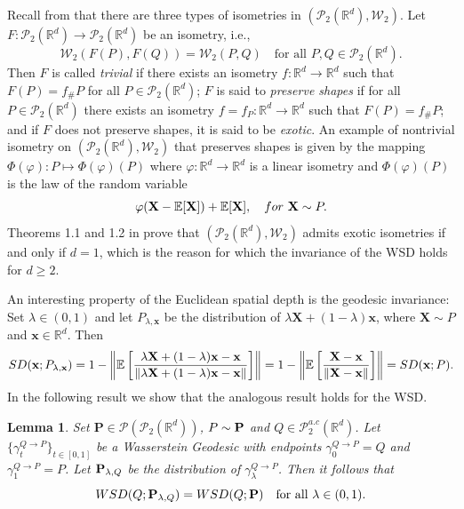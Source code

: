 \documentclass{imsart}
\newtheorem {Lemma}[Proposition] {Lemma}
\numberwithin{equation}{section}
\def\R{\mathbb{R}}
\def\E{\mathbb{E}}
\def\x{\mathbf{x}}
\def\X{\mathbf{X}}
\def\E{\mathbb E}
\def\x{\mathbf x}
\begin{document}
Recall from \cite{bertrand2012geometric} that there are three types of isometries in $(\mathcal{P}_2(\R^d), \mathcal{W}_2)$.
Let  $F:\mathcal{P}_2(\R^d)\to \mathcal{P}_2(\R^d)$ be an isometry, i.e., 
$$ \mathcal{W}_2(F(P), F(Q))=\mathcal{W}_2(P,Q)\quad \text{for all }P,Q\in \mathcal{P}_2(\R^d).$$
Then $F$ is called {\it trivial}  if there exists an isometry  $  f:\R^d\to \R^d$ such that 
$ F(P)=f_\# P$ for all $P\in \mathcal{P}_2(\R^d)$; $F$  is said to {\it preserve shapes} if for all $P\in\mathcal{P}_2(\R^d) $  there exists an isometry  $  f=f_P:\R^d\to \R^d$ such that $ F(P)=f_\# P$; and if $F$ does not preserve shapes, it is said to be {\it exotic}.  An example of nontrivial isometry  on $(\mathcal{P}_2(\R^d), \mathcal{W}_2)$ that preserves shapes is given by the mapping $\Phi(\varphi):P\mapsto \Phi(\varphi)(P)$  where $\varphi:\R^d\to \R^d$ is a linear isometry and $\Phi(\varphi)(P)$ is the
law of the random variable 
$$ \varphi(\X-\E[\X])+\E[\X], \quad {\rm for
}\ \X\sim P . $$
Theorems 1.1 and 1.2 in \cite{bertrand2012geometric} prove that $(\mathcal{P}_2(\R^d), \mathcal{W}_2)$ admits exotic isometries if and only if $d=1$, which is the reason for which the invariance of the WSD holds for $d\geq 2$. 

An interesting property of the Euclidean spatial depth is the geodesic invariance: Set $\lambda\in (0,1)$ and let  $P_{\lambda,\x}$ be the distribution of $ \lambda  \X+ (1-\lambda ) \x $, where $\X\sim P$ and $\x\in \R^d$. Then
$$  \rm SD(\x; P_{\lambda,\x})=1-\left\|\E\left[\frac{\lambda  \X+ (1-\lambda ) \x-\x}{\|\lambda  \X+ (1-\lambda ) \x-\x\|}\right]\right\|= 1-\left\|\E\left[\frac{ \X-\x}{\| \X-\x\|}\right]\right\|= \rm SD(\x; P) .$$
In the following result we show that the analogous result holds for the WSD.
\begin{Lemma}\label{lemma:geo-inva}
	Set  $\mathbf{P}\in \mathcal{P}(\mathcal{P}_2(\R^d)) $,   $P\sim {\bf P}$ and $ Q\in  \mathcal{P}^{a.c}_2(\R^d)$. Let $\{\gamma_t^{Q\to P} \}_{t\in [0,1]}$ be a Wasserstein Geodesic with endpoints $\gamma^{Q\to P}_0 = Q $ and $\gamma^{Q\to P}_1 = P $. Let ${\bf P}_{\lambda,Q}$ be the distribution of  $\gamma^{Q\to P}_\lambda$. Then it follows that 
	$$   {\rm WSD}(Q; {\bf P}_{\lambda,Q}) =  {\rm WSD}(Q; {\bf P})\quad \text{for all }\lambda\in (0,1).$$
\end{Lemma}
\end{document}
